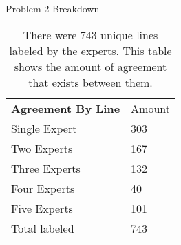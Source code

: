 \begin{table}[htbp]
\centering
\caption{Problem 2 Breakdown}
\label{expert2}
\begin{tabular}{ll}
\textbf{Agreement By Line} & {Amount} \\
Single Expert       & 303                    \\
Two Experts         & 167                    \\
Three Experts       & 132                     \\
Four Experts        & 40                    \\
Five Experts        & 101                    \\
Total labeled       & 743                   
\end{tabular}
\caption*{There were 743 unique lines labeled by the experts. This table shows the amount of agreement that exists between them.}
\end{table}